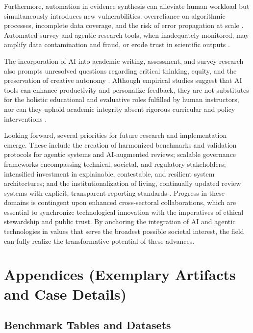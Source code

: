 Furthermore, automation in evidence synthesis can alleviate human workload but simultaneously introduces new vulnerabilities: overreliance on algorithmic processes, incomplete data coverage, and the risk of error propagation at scale \cite{ref74,ref80,ref84,ref102,ref104}. Automated survey and agentic research tools, when inadequately monitored, may amplify data contamination and fraud, or erode trust in scientific outputs \cite{ref89,ref90,ref91,ref92,ref93,ref94,ref95,ref96,ref97,ref98,ref100,ref101,ref105,ref106,ref113,ref114,ref115}.

The incorporation of AI into academic writing, assessment, and survey research also prompts unresolved questions regarding critical thinking, equity, and the preservation of creative autonomy \cite{ref86,ref87,ref88,ref89,ref90,ref91,ref92,ref93,ref94,ref101,ref114,ref115,ref117}. Although empirical studies suggest that AI tools can enhance productivity and personalize feedback, they are not substitutes for the holistic educational and evaluative roles fulfilled by human instructors, nor can they uphold academic integrity absent rigorous curricular and policy interventions \cite{ref87,ref89,ref92,ref94,ref114,ref115,ref117}.

Looking forward, several priorities for future research and implementation emerge. These include the creation of harmonized benchmarks and validation protocols for agentic systems and AI-augmented reviews; scalable governance frameworks encompassing technical, societal, and regulatory stakeholders; intensified investment in explainable, contestable, and resilient system architectures; and the institutionalization of living, continually updated review systems with explicit, transparent reporting standards \cite{ref74,ref75,ref80,ref84,ref95,ref97,ref98,ref100,ref102,ref104,ref106,ref109,ref110,ref113,ref114}. Progress in these domains is contingent upon enhanced cross-sectoral collaborations, which are essential to synchronize technological innovation with the imperatives of ethical stewardship and public trust. By anchoring the integration of AI and agentic technologies in values that serve the broadest possible societal interest, the field can fully realize the transformative potential of these advances.

\section{Appendices (Exemplary Artifacts and Case Details)}

\subsection{Benchmark Tables and Datasets}

